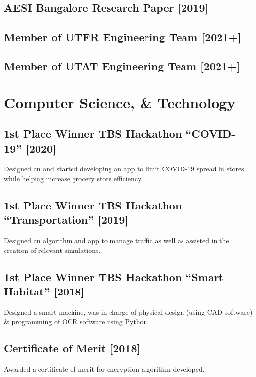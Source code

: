 \documentclass[%
               doublesided,
               paper=a4,
               fontsize=10pt
              ]{resumestyle}
\begin{document}
{        \subsection{AESI Bangalore Research Paper [2019]}
        
        \subsection{Member of UTFR Engineering Team [2021+]}
        
        \subsection{Member of UTAT Engineering Team [2021+]}

    \section{Computer Science, \& Technology}
        \subsection{1st Place Winner TBS Hackathon ``COVID-19'' [2020]}
            Designed an and started developing an app to limit COVID-19 spread in stores while helping increase grocery store efficiency.
            
        \subsection{1st Place Winner TBS Hackathon ``Transportation'' [2019]}
             Designed an algorithm and app to manage traffic as well as assisted in the creation of relevant simulations.
             
        \subsection{1st Place Winner TBS Hackathon ``Smart Habitat'' [2018]}
            Designed a smart machine, was in charge of physical design (using CAD software) & programming of OCR software using Python.
            
        \subsection{Certificate of Merit [2018]}
            Awarded a certificate of merit for encryption algorithm developed.
            
}
\end{document}
